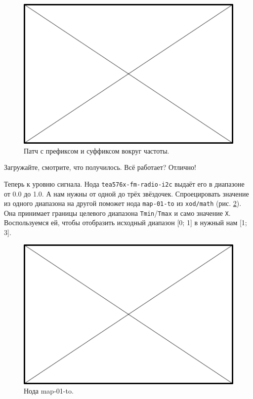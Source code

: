 \begin{figure}
  \centering
  \includegraphics{TODO}
  \caption{Патч с префиксом и суффиксом вокруг частоты.}
  \label{patch:fm-join}
\end{figure}

Загружайте, смотрите, что получилось. Всё работает? Отлично!

Теперь к уровню сигнала. Нода \texttt{tea576x-fm-radio-i2c} выдаёт его в диапазоне от 0.0 до 1.0. А нам нужны от одной до трёх звёздочек. Спроецировать значение из одного диапазона на другой поможет нода \texttt{map-01-to} из \texttt{xod/math} (рис. \ref{patch:node-map-01-to}). Она принимает границы целевого диапазона \texttt{Tmin}/\texttt{Tmax} и само значение \texttt{X}. Воспользуемся ей, чтобы отобразить исходный диапазон [0; 1] в нужный нам [1; 3].

\begin{figure}
  \centering
  \includegraphics{TODO}
  \caption{Нода map-01-to.}
  \label{patch:node-map-01-to}
\end{figure}

